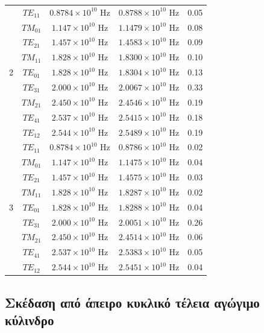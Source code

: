 \documentclass[10pt, letterpaper]{article}
\newcommand{\gr}{\selectlanguage{greek}}
\begin{document}
\begin{center}
\begin{tabular}{|c|c|c|c|c|}
    \multirow{9}{*}{2} 
    & $TE_{11}$ & $0.8784 \times 10^{10}$ Hz & $0.8788 \times 10^{10}$ Hz & 0.05 \\
    & $TM_{01}$ & $1.147 \times 10^{10}$ Hz  & $1.1479 \times 10^{10}$ Hz & 0.08 \\
    & $TE_{21}$ & $1.457 \times 10^{10}$ Hz  & $1.4583 \times 10^{10}$ Hz & 0.09 \\
    & $TM_{11}$ & $1.828 \times 10^{10}$ Hz  & $1.8300 \times 10^{10}$ Hz & 0.10 \\
    & $TE_{01}$ & $1.828 \times 10^{10}$ Hz  & $1.8304 \times 10^{10}$ Hz & 0.13 \\
    & $TE_{31}$ & $2.000 \times 10^{10}$ Hz  & $2.0067 \times 10^{10}$ Hz & 0.33 \\
    & $TM_{21}$ & $2.450 \times 10^{10}$ Hz  & $2.4546 \times 10^{10}$ Hz & 0.19 \\
    & $TE_{41}$ & $2.537 \times 10^{10}$ Hz  & $2.5415 \times 10^{10}$ Hz & 0.18 \\
    & $TE_{12}$ & $2.544 \times 10^{10}$ Hz  & $2.5489 \times 10^{10}$ Hz & 0.19 \\
    \hline
    
    \multirow{9}{*}{3} 
    & $TE_{11}$ & $0.8784 \times 10^{10}$ Hz & $0.8786 \times 10^{10}$ Hz & 0.02 \\
    & $TM_{01}$ & $1.147 \times 10^{10}$ Hz  & $1.1475 \times 10^{10}$ Hz & 0.04 \\
    & $TE_{21}$ & $1.457 \times 10^{10}$ Hz  & $1.4575 \times 10^{10}$ Hz & 0.03 \\
    & $TM_{11}$ & $1.828 \times 10^{10}$ Hz  & $1.8287 \times 10^{10}$ Hz & 0.02 \\
    & $TE_{01}$ & $1.828 \times 10^{10}$ Hz  & $1.8288 \times 10^{10}$ Hz & 0.04 \\
    & $TE_{31}$ & $2.000 \times 10^{10}$ Hz  & $2.0051 \times 10^{10}$ Hz & 0.26 \\
    & $TM_{21}$ & $2.450 \times 10^{10}$ Hz  & $2.4514 \times 10^{10}$ Hz & 0.06 \\
    & $TE_{41}$ & $2.537 \times 10^{10}$ Hz  & $2.5383 \times 10^{10}$ Hz & 0.05 \\
    & $TE_{12}$ & $2.544 \times 10^{10}$ Hz  & $2.5451 \times 10^{10}$ Hz & 0.04 \\
    \hline
  \end{tabular}
    
\end{center}
\gr



\subsection*{Σκέδαση από άπειρο κυκλικό τέλεια αγώγιμο κύλινδρο}
\end{document}
